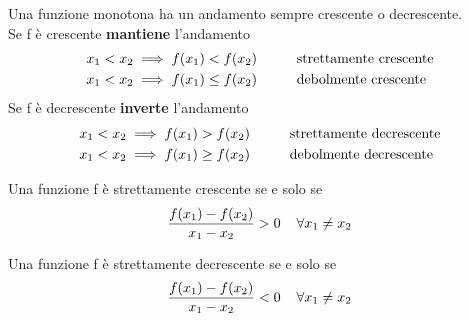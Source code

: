 \documentclass{article}
\begin{document}
Una funzione monotona ha un andamento sempre crescente o decrescente. \\
Se f è crescente \textbf{mantiene} l'andamento
\begin{align*}
    x_1 < x_2 &\implies f(x_1) < f(x_2) \hspace{1cm} \text{strettamente crescente} \\
    x_1 < x_2 &\implies f(x_1) \leq f(x_2) \hspace{1cm} \text{debolmente crescente} \\
\end{align*}
Se f è decrescente \textbf{inverte} l'andamento
\begin{align*}
    x_1 < x_2 &\implies f(x_1) > f(x_2) \hspace{1cm} \text{strettamente decrescente} \\
    x_1 < x_2 &\implies f(x_1) \geq f(x_2) \hspace{1cm} \text{debolmente decrescente} \\
\end{align*}

Una funzione f è strettamente crescente se e solo se
\[\frac{f(x_1) - f(x_2)}{x_1 - x_2} > 0 \hspace{.4cm} \forall x_1 \neq x_2\]

Una funzione f è strettamente decrescente se e solo se
\[\frac{f(x_1) - f(x_2)}{x_1 - x_2} < 0 \hspace{.4cm} \forall x_1 \neq x_2\]
\end{document}
